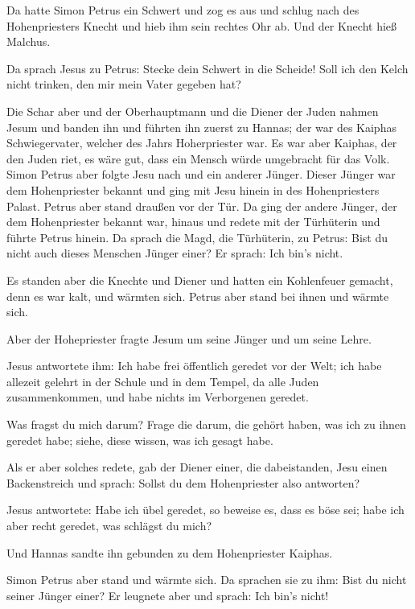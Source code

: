  Da hatte Simon Petrus ein Schwert und zog es aus und
schlug nach des Hohenpriesters Knecht und hieb ihm sein rechtes Ohr ab.
Und der Knecht hieß Malchus.

 Da sprach Jesus zu Petrus: Stecke dein Schwert in die
Scheide! Soll ich den Kelch nicht trinken, den mir mein Vater gegeben
hat?

 Die Schar aber und der Oberhauptmann und die Diener der
Juden nahmen Jesum und banden ihn  und führten ihn zuerst
zu Hannas; der war des Kaiphas Schwiegervater, welcher des Jahrs
Hoherpriester war.  Es war aber Kaiphas, der den Juden
riet, es wäre gut, dass ein Mensch würde umgebracht für das Volk.
 Simon Petrus aber folgte Jesu nach und ein anderer
Jünger. Dieser Jünger war dem Hohenpriester bekannt und ging mit Jesu
hinein in des Hohenpriesters Palast.  Petrus aber stand
draußen vor der Tür. Da ging der andere Jünger, der dem Hohenpriester
bekannt war, hinaus und redete mit der Türhüterin und führte Petrus
hinein.  Da sprach die Magd, die Türhüterin, zu Petrus:
Bist du nicht auch dieses Menschen Jünger einer? Er sprach: Ich bin's
nicht.

 Es standen aber die Knechte und Diener und hatten ein
Kohlenfeuer gemacht, denn es war kalt, und wärmten sich. Petrus aber
stand bei ihnen und wärmte sich.

 Aber der Hohepriester fragte Jesum um seine Jünger und
um seine Lehre.

 Jesus antwortete ihm: Ich habe frei öffentlich geredet
vor der Welt; ich habe allezeit gelehrt in der Schule und in dem Tempel,
da alle Juden zusammenkommen, und habe nichts im Verborgenen geredet.

 Was fragst du mich darum? Frage die darum, die gehört
haben, was ich zu ihnen geredet habe; siehe, diese wissen, was ich
gesagt habe.

 Als er aber solches redete, gab der Diener einer, die
dabeistanden, Jesu einen Backenstreich und sprach: Sollst du dem
Hohenpriester also antworten?

 Jesus antwortete: Habe ich übel geredet, so beweise es,
dass es böse sei; habe ich aber recht geredet, was schlägst du mich?

 Und Hannas sandte ihn gebunden zu dem Hohenpriester
Kaiphas.

 Simon Petrus aber stand und wärmte sich. Da sprachen sie
zu ihm: Bist du nicht seiner Jünger einer? Er leugnete aber und sprach:
Ich bin's nicht!

